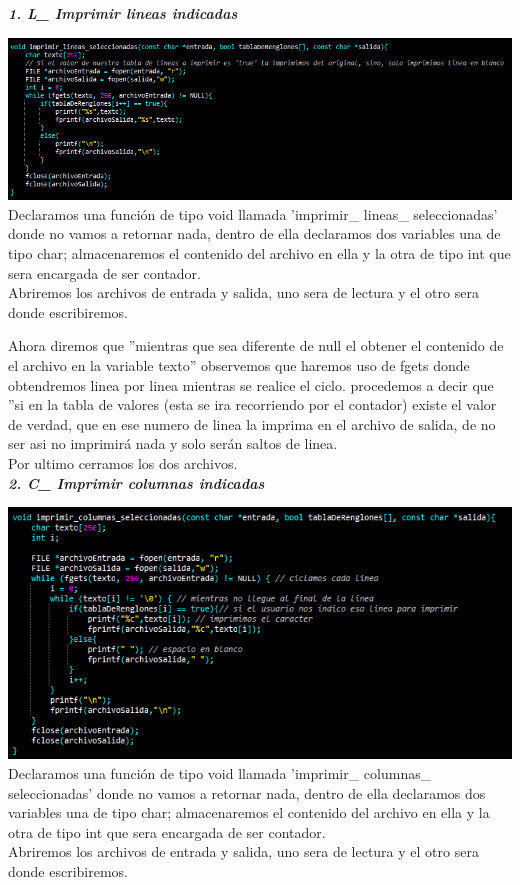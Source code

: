 \documentclass[12pt,letterpaper]{report}
\begin{document}
\newpage
\textbf{\textit{ 1. L\_  Imprimir lineas indicadas}}\\
\begin{multicols}{2}

\includegraphics[scale=0.4]{punto1}
Declaramos una función de tipo void llamada 'imprimir\_ lineas\_ seleccionadas' donde no vamos a retornar nada, dentro de ella declaramos dos variables una de tipo char; almacenaremos el contenido del archivo en ella y la otra de tipo int que sera encargada de ser contador.\\
Abriremos los archivos de entrada y salida, uno sera de lectura y el otro sera donde escribiremos.\\
\end{multicols}
Ahora diremos que ''mientras que sea diferente de null el obtener el contenido de el archivo en la variable texto'' observemos que haremos uso de fgets donde obtendremos linea por linea mientras se realice el ciclo. procedemos a decir que ''si en la tabla de valores (esta se ira recorriendo por el contador) existe el valor de verdad, que en ese numero de linea la imprima en el archivo de salida, de no ser asi no imprimirá nada y solo serán saltos de linea.\\ 
Por ultimo cerramos los dos archivos.\\

\textbf{\textit{ 2. C\_  Imprimir columnas indicadas}}\\

\begin{multicols}{2}
\includegraphics[scale=0.5]{punto2}
Declaramos una función de tipo void llamada 'imprimir\_ columnas\_ seleccionadas' donde no vamos a retornar nada, dentro de ella declaramos dos variables una de tipo char; almacenaremos el contenido del archivo en ella y la otra de tipo int que sera encargada de ser contador.\\
Abriremos los archivos de entrada y salida, uno sera de lectura y el otro sera donde escribiremos.\\
\end{multicols}
\end{document}
